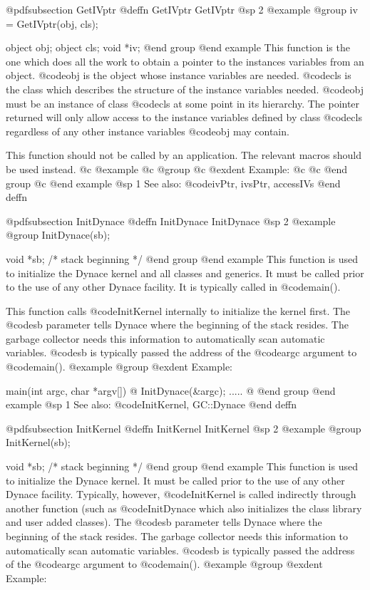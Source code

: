 {{{{@pdfsubsection {GetIVptr}
@deffn {GetIVptr} GetIVptr
@sp 2
@example
@group
iv = GetIVptr(obj, cls);

object  obj;
object  cls;
void    *iv;
@end group
@end example
This function is the one which does all the work to obtain
a pointer to the instances variables from an object.  @code{obj}
is the object whose instance variables are needed.  @code{cls}
is the class which describes the structure of the instance
variables needed.  @code{obj} must be an instance of class @code{cls}
at some point in its hierarchy.  The pointer returned will only allow
access to the instance variables defined by class @code{cls} regardless
of any other instance variables @code{obj} may contain.

This function should not be called by an application.  The relevant
macros should be used instead.
@c @example
@c @group
@c @exdent Example:
@c 
@c @end group
@c @end example
@sp 1
See also:  @code{ivPtr, ivsPtr, accessIVs}
@end deffn







@pdfsubsection {InitDynace}
@deffn {InitDynace} InitDynace
@sp 2
@example
@group
InitDynace(sb);

void    *sb;  /*  stack beginning  */
@end group
@end example
This function is used to initialize the Dynace kernel and all classes
and generics.  It must be called prior to the use of any other Dynace
facility.  It is typically called in @code{main()}.

This function calls @code{InitKernel} internally to initialize the
kernel first.  The @code{sb} parameter tells Dynace where the beginning
of the stack resides.  The garbage collector needs this information to
automatically scan automatic variables.  @code{sb} is typically passed
the address of the @code{argc} argument to @code{main()}.
@example
@group
@exdent Example:

main(int argc, char *argv[])
@{
        InitDynace(&argc);
        .....
@}
@end group
@end example
@sp 1
See also:  @code{InitKernel, GC::Dynace}
@end deffn






@pdfsubsection {InitKernel}
@deffn {InitKernel} InitKernel
@sp 2
@example
@group
InitKernel(sb);

void    *sb;  /*  stack beginning  */
@end group
@end example
This function is used to initialize the Dynace kernel.  It must be
called prior to the use of any other Dynace facility.  Typically,
however, @code{InitKernel} is called indirectly through another function
(such as @code{InitDynace} which also initializes the class library and
user added classes).  The @code{sb} parameter tells Dynace where the
beginning of the stack resides.  The garbage collector needs this
information to automatically scan automatic variables.  @code{sb} is
typically passed the address of the @code{argc} argument to
@code{main()}.
@example
@group
@exdent Example:

}}}}
